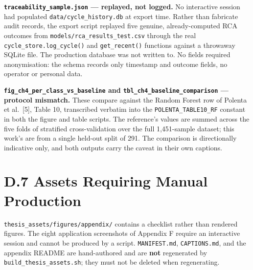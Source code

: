 \textbf{\texttt{traceability\_sample.json} --- replayed, not logged.} No interactive session had populated \texttt{data/cycle\_history.db} at export time. Rather than fabricate audit records, the export script replayed five genuine, already-computed RCA outcomes from \texttt{models/rca\_results\_test.csv} through the real \texttt{cycle\_store.log\_cycle()} and \texttt{get\_recent()} functions against a throwaway SQLite file. The production database was not written to. No fields required anonymisation: the schema records only timestamp and outcome fields, no operator or personal data.

\textbf{\texttt{fig\_ch4\_per\_class\_vs\_baseline} and \texttt{tbl\_ch4\_baseline\_comparison} --- protocol mismatch.} These compare against the Random Forest row of Polenta et al.~{[}5{]}, Table 10, transcribed verbatim into the \texttt{POLENTA\_TABLE10\_RF} constant in both the figure and table scripts. The reference's values are summed across the five folds of stratified cross-validation over the full 1,451-sample dataset; this work's are from a single held-out split of 291. The comparison is directionally indicative only, and both outputs carry the caveat in their own captions.

\hypertarget{d.7-assets-requiring-manual-production}{%
\section{D.7 Assets Requiring Manual Production}\label{d.7-assets-requiring-manual-production}}

\texttt{thesis\_assets/figures/appendix/} contains a checklist rather than rendered figures. The eight application screenshots of Appendix F require an interactive session and cannot be produced by a script. \texttt{MANIFEST.md}, \texttt{CAPTIONS.md}, and the appendix README are hand-authored and are \textbf{not} regenerated by \texttt{build\_thesis\_assets.sh}; they must not be deleted when regenerating.
